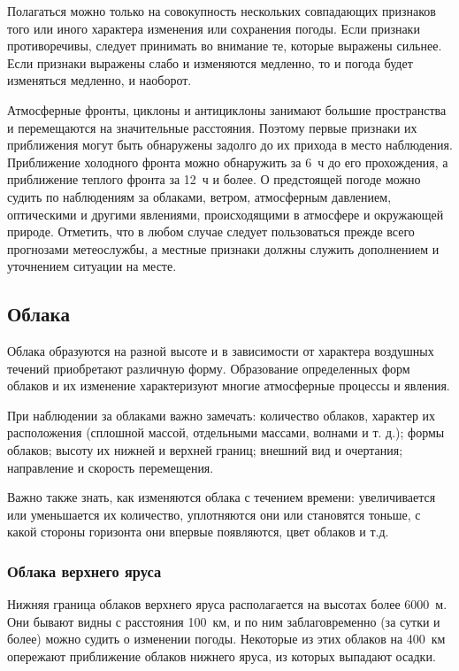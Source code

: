 Полагаться можно только на совокупность нескольких совпадающих
признаков того или иного характера изменения или сохранения
погоды. Если признаки противоречивы, следует принимать во внимание те,
которые выражены сильнее. Если признаки выражены слабо и изменяются
медленно, то и погода будет изменяться медленно, и наоборот.

Атмосферные фронты, циклоны и антициклоны занимают большие
пространства и перемещаются на значительные расстояния. Поэтому первые
признаки их приближения могут быть обнаружены задолго до их прихода в
место наблюдения. Приближение холодного фронта можно обнаружить за 6~ч
до его прохождения, а приближение теплого фронта за 12~ч и
более. О предстоящей погоде можно судить по наблюдениям за облаками,
ветром, атмосферным давлением, оптическими и другими явлениями,
происходящими в атмосфере и окружающей природе. Отметить, что в любом
случае следует пользоваться прежде всего прогнозами метеослужбы, а
местные признаки должны служить дополнением и уточнением ситуации на
месте.

\subsection{Облака}

Облака образуются на разной высоте и в зависимости от характера
воздушных течений приобретают различную форму. Образование
определенных форм облаков и их изменение характеризуют многие
атмосферные процессы и явления.

При наблюдении за облаками важно замечать: количество облаков,
характер их расположения (сплошной массой, отдельными массами, волнами
и т. д.); формы облаков; высоту их нижней и верхней границ; внешний
вид и очертания; направление и скорость перемещения.

Важно также знать, как изменяются облака с течением времени:
увеличивается или уменьшается их количество, уплотняются они или
становятся тоньше, с какой стороны горизонта они впервые появляются,
цвет облаков и т.д.

\subsubsection{Облака верхнего яруса}

Нижняя граница облаков верхнего яруса располагается на высотах более
6000~м. Они бывают видны с расстояния 100~км, и по ним
заблаговременно (за сутки и более) можно судить о изменении
погоды. Некоторые из этих облаков на 400~км опережают
приближение облаков нижнего яруса, из которых выпадают осадки.

